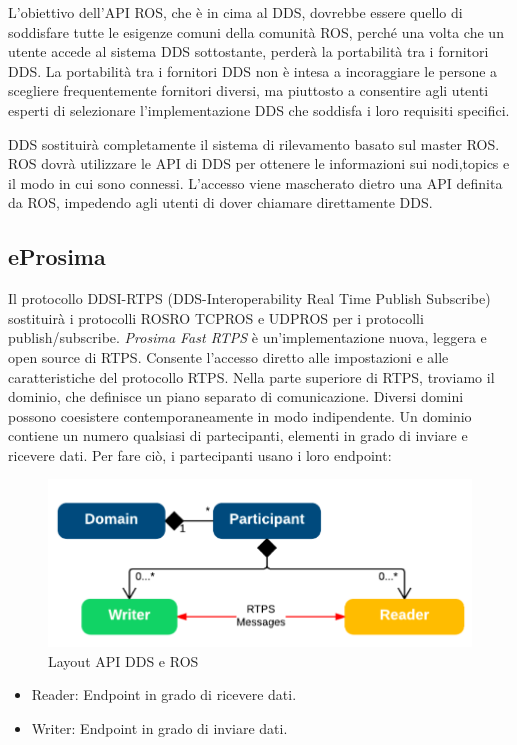 \documentclass[a4paper]{article}
\begin{document}
L'obiettivo dell'API ROS, che è in cima al DDS, dovrebbe essere quello di soddisfare tutte le esigenze comuni della comunità ROS, perché una volta che un utente accede al sistema DDS sottostante, perderà la portabilità tra i fornitori DDS. La portabilità tra i fornitori DDS non è intesa a incoraggiare le persone a scegliere frequentemente fornitori diversi, ma piuttosto a consentire agli utenti esperti di selezionare l'implementazione DDS che soddisfa i loro requisiti specifici. 

DDS sostituirà completamente il sistema di rilevamento basato sul master ROS. ROS dovrà utilizzare le API di DDS per ottenere le informazioni sui nodi,topics e il modo in cui sono connessi. L'accesso viene mascherato dietro una API definita da ROS, impedendo agli utenti di dover chiamare direttamente DDS. 


\subsection{eProsima}
Il protocollo DDSI-RTPS (DDS-Interoperability Real Time Publish Subscribe) sostituirà i protocolli ROSRO TCPROS e UDPROS per i protocolli publish/subscribe.
\textit{Prosima Fast RTPS} è un'implementazione  nuova, leggera e open source di RTPS. Consente l'accesso diretto alle impostazioni e alle caratteristiche del protocollo RTPS.
Nella parte superiore di RTPS, troviamo il dominio, che definisce un piano separato di comunicazione. Diversi domini possono coesistere contemporaneamente in modo indipendente. Un dominio contiene un numero qualsiasi di partecipanti, elementi in grado di inviare e ricevere dati. Per fare ciò, i partecipanti usano i loro endpoint:

\begin{figure}[htbp]
\centering
\includegraphics[scale=0.5]{dds_img1.PNG} 
\caption{Layout API DDS e ROS}
\end{figure}

\begin{itemize}
\item Reader: Endpoint in grado di ricevere dati.

\item Writer: Endpoint in grado di inviare dati.
\end{itemize}
\end{document}
